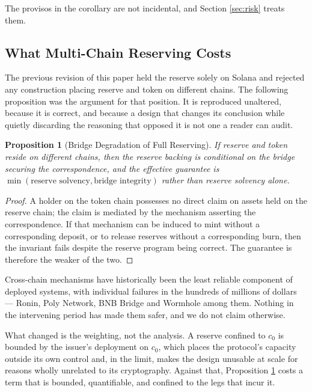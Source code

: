 \documentclass[11pt,a4paper]{article}
\newtheorem{proposition}[theorem]{Proposition}
\begin{document}
The provisos in the corollary are not incidental, and Section \ref{sec:risk} treats them.

\subsection{What Multi-Chain Reserving Costs}
\label{sec:bridgecost}

The previous revision of this paper held the reserve solely on Solana and rejected any construction placing reserve and token on different chains. The following proposition was the argument for that position. It is reproduced unaltered, because it is correct, and because a design that changes its conclusion while quietly discarding the reasoning that opposed it is not one a reader can audit.

\begin{proposition}[Bridge Degradation of Full Reserving]
\label{prop:bridge}
If reserve and token reside on different chains, then the reserve backing is conditional on the bridge securing the correspondence, and the effective guarantee is $\min(\text{reserve solvency}, \text{bridge integrity})$ rather than reserve solvency alone.
\end{proposition}

\begin{proof}
A holder on the token chain possesses no direct claim on assets held on the reserve chain; the claim is mediated by the mechanism asserting the correspondence. If that mechanism can be induced to mint without a corresponding deposit, or to release reserves without a corresponding burn, then the invariant fails despite the reserve program being correct. The guarantee is therefore the weaker of the two.
\end{proof}

Cross-chain mechanisms have historically been the least reliable component of deployed systems, with individual failures in the hundreds of millions of dollars --- Ronin, Poly Network, BNB Bridge and Wormhole among them. Nothing in the intervening period has made them safer, and we do not claim otherwise.

What changed is the weighting, not the analysis. A reserve confined to $c_0$ is bounded by the issuer's deployment on $c_0$, which places the protocol's capacity outside its own control and, in the limit, makes the design unusable at scale for reasons wholly unrelated to its cryptography. Against that, Proposition \ref{prop:bridge} costs a term that is bounded, quantifiable, and confined to the legs that incur it.
\end{document}
